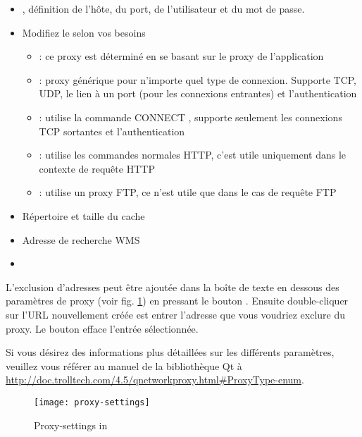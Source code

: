 {\setlength{\baselineskip}{1.4\baselineskip}
\begin{itemize}[label=--]
\item {}, définition de l'hôte, du port, de l'utilisateur et du mot de passe.
\item Modifiez le  selon vos besoins
 \begin{itemize}[label=--,itemsep=2pt]
  \item {}: ce proxy est déterminé en se basant sur le proxy de l'application
  \item {}: proxy générique pour n'importe quel type de connexion. Supporte TCP, UDP, le lien à un port (pour les connexions entrantes) et l'authentication
  \item {}: utilise la commande \og CONNECT \fg, supporte seulement les connexions TCP sortantes et l'authentication
  \item {}: utilise les commandes normales HTTP, c'est utile uniquement dans le contexte de requête HTTP
  \item {}: utilise un proxy FTP, ce n'est utile que dans le cas de requête FTP
\end{itemize}
\item Répertoire et taille du cache
\item Adresse de recherche WMS
\item {}
\end{itemize}}

L'exclusion d'adresses peut être ajoutée dans la boîte de texte en dessous des paramètres de proxy (voir fig. \ref{fig:proxy-settings}) en pressant le bouton . Ensuite double-cliquer sur l'URL nouvellement créée est entrer l'adresse que vous voudriez exclure du proxy. Le bouton  efface l'entrée sélectionnée.

Si vous désirez des informations plus détaillées sur les différents paramètres, veuillez vous référer au manuel de la bibliothèque Qt à \url{http://doc.trolltech.com/4.5/qnetworkproxy.html#ProxyType-enum}.

\begin{figure}[ht]
   \begin{center}
   \texttt{[image: proxy-settings]}
   \caption{Proxy-settings in \qg \nixcaption}
   \label{fig:proxy-settings}
\end{center} 
\end{figure}

